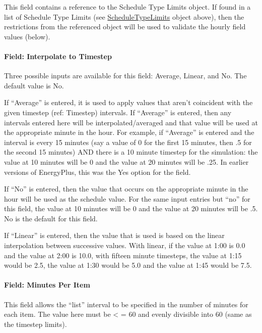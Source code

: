 This field contains a reference to the Schedule Type Limits object. If found in a list of Schedule Type Limits (see \hyperref[scheduletypelimits]{ScheduleTypeLimits} object above), then the restrictions from the referenced object will be used to validate the hourly field values (below).

\paragraph{Field: Interpolate to Timestep}\label{field-interpolate-to-timestep-1}

Three possible inputs are available for this field: Average, Linear, and No. The default value is No.

If ``Average'' is entered, it is used to apply values that aren't coincident with the given timestep (ref: Timestep) intervals. If ``Average'' is entered, then any intervals entered here will be interpolated/averaged and that value will be used at the appropriate minute in the hour. For example, if ``Average'' is entered and the interval is every 15 minutes (say a value of 0 for the first 15 minutes, then .5 for the second 15 minutes) AND there is a 10 minute timestep for the simulation: the value at 10 minutes will be 0 and the value at 20 minutes will be .25. In earlier versions of EnergyPlus, this was the Yes option for the field.

If ``No'' is entered, then the value that occurs on the appropriate minute in the hour will be used as the schedule value. For the same input entries but ``no'' for this field, the value at 10 minutes will be 0 and the value at 20 minutes will be .5. No is the default for this field.

If ``Linear'' is entered, then the value that is used is based on the linear interpolation between successive values. With linear, if the value at 1:00 is 0.0 and the value at 2:00 is 10.0, with fifteen minute timesteps, the value at 1:15 would be 2.5, the value at 1:30 would be 5.0 and the value at 1:45 would be 7.5.


\paragraph{Field: Minutes Per Item}\label{field-minutes-per-item}

This field allows the ``list'' interval to be specified in the number of minutes for each item. The value here must be \textless{} = 60 and evenly divisible into 60 (same as the timestep limits).

